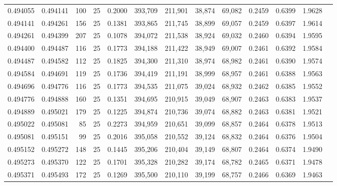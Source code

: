 \begin{tabular}{rrrrrrrrrrrrr}
0.494055 & 0.494141 &   100 &  25 &                                     0.2000 & 393,709 & 211,901 &  38,874 &  69,082 & 0.2459 & 0.6399 & 1.9628 \\
0.494141 & 0.494261 &   156 &  25 &                                     0.1381 & 393,865 & 211,745 &  38,899 &  69,057 & 0.2459 & 0.6397 & 1.9614 \\
0.494261 & 0.494399 &   207 &  25 &                                     0.1078 & 394,072 & 211,538 &  38,924 &  69,032 & 0.2460 & 0.6394 & 1.9595 \\
0.494400 & 0.494487 &   116 &  25 &                                     0.1773 & 394,188 & 211,422 &  38,949 &  69,007 & 0.2461 & 0.6392 & 1.9584 \\
0.494487 & 0.494582 &   112 &  25 &                                     0.1825 & 394,300 & 211,310 &  38,974 &  68,982 & 0.2461 & 0.6390 & 1.9574 \\
0.494584 & 0.494691 &   119 &  25 &                                     0.1736 & 394,419 & 211,191 &  38,999 &  68,957 & 0.2461 & 0.6388 & 1.9563 \\
0.494696 & 0.494776 &   116 &  25 &                                     0.1773 & 394,535 & 211,075 &  39,024 &  68,932 & 0.2462 & 0.6385 & 1.9552 \\
0.494776 & 0.494888 &   160 &  25 &                                     0.1351 & 394,695 & 210,915 &  39,049 &  68,907 & 0.2463 & 0.6383 & 1.9537 \\
0.494889 & 0.495021 &   179 &  25 &                                     0.1225 & 394,874 & 210,736 &  39,074 &  68,882 & 0.2463 & 0.6381 & 1.9521 \\
0.495022 & 0.495081 &    85 &  25 &                                     0.2273 & 394,959 & 210,651 &  39,099 &  68,857 & 0.2464 & 0.6378 & 1.9513 \\
0.495081 & 0.495151 &    99 &  25 &                                     0.2016 & 395,058 & 210,552 &  39,124 &  68,832 & 0.2464 & 0.6376 & 1.9504 \\
0.495152 & 0.495272 &   148 &  25 &                                     0.1445 & 395,206 & 210,404 &  39,149 &  68,807 & 0.2464 & 0.6374 & 1.9490 \\
0.495273 & 0.495370 &   122 &  25 &                                     0.1701 & 395,328 & 210,282 &  39,174 &  68,782 & 0.2465 & 0.6371 & 1.9478 \\
0.495371 & 0.495493 &   172 &  25 &                                     0.1269 & 395,500 & 210,110 &  39,199 &  68,757 & 0.2466 & 0.6369 & 1.9463 \\

\end{tabular}
